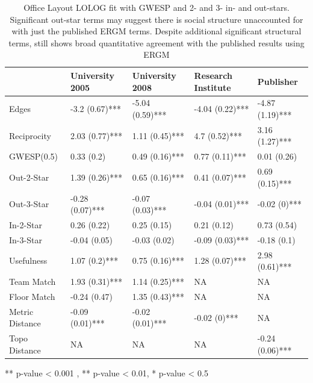 \documentclass[
]{statsoc}
\begin{document}
\begin{table}

\caption{\label{tab:unnamed-chunk-4}\label{tab:sailer_lolog_gwesp_star}
      Office Layout LOLOG fit with GWESP and 2- and 3- in- and out-stars. Significant out-star terms may suggest there is social structure unaccounted for with just the published ERGM terms. Despite additional significant structural terms, still shows broad quantitative agreement with the published results using ERGM}
\centering
\begin{threeparttable}
\begin{tabular}[t]{lllll}
\toprule
  & University 2005 & University 2008 & Research Institute & Publisher\\
\midrule
\rowcolor{gray!6}  Edges & -3.2 (0.67)*** & -5.04 (0.59)*** & -4.04 (0.22)*** & -4.87 (1.19)***\\
Reciprocity & 2.03 (0.77)*** & 1.11 (0.45)*** & 4.7 (0.52)*** & 3.16 (1.27)***\\
\rowcolor{gray!6}  GWESP(0.5) & 0.33 (0.2) & 0.49 (0.16)*** & 0.77 (0.11)*** & 0.01 (0.26)\\
Out-2-Star & 1.39 (0.26)*** & 0.65 (0.16)*** & 0.41 (0.07)*** & 0.69 (0.15)***\\
\rowcolor{gray!6}  Out-3-Star & -0.28 (0.07)*** & -0.07 (0.03)*** & -0.04 (0.01)*** & -0.02 (0)***\\
\addlinespace
In-2-Star & 0.26 (0.22) & 0.25 (0.15) & 0.21 (0.12) & 0.73 (0.54)\\
\rowcolor{gray!6}  In-3-Star & -0.04 (0.05) & -0.03 (0.02) & -0.09 (0.03)*** & -0.18 (0.1)\\
Usefulness & 1.07 (0.2)*** & 0.75 (0.16)*** & 1.28 (0.07)*** & 2.98 (0.61)***\\
\rowcolor{gray!6}  Team Match & 1.93 (0.31)*** & 1.14 (0.25)*** & NA & NA\\
Floor Match & -0.24 (0.47) & 1.35 (0.43)*** & NA & NA\\
\addlinespace
\rowcolor{gray!6}  Metric Distance & -0.09 (0.01)*** & -0.02 (0.01)*** & -0.02 (0)*** & NA\\
Topo Distance & NA & NA & NA & -0.24 (0.06)***\\
\bottomrule
\end{tabular}
\begin{tablenotes}
\item *** p-value < 0.001 , ** p-value < 0.01, * p-value < 0.5
\end{tablenotes}
\end{threeparttable}
\end{table}
\end{document}
